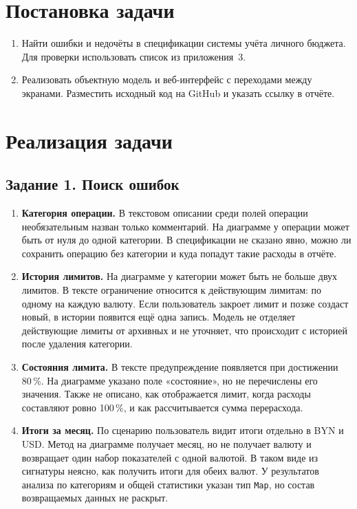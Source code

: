 \documentclass[14pt,a4paper]{extarticle}
\begin{document}
\setcounter{page}{1}

\section*{Постановка задачи}

\begin{enumerate}
    \item Найти ошибки и недочёты в спецификации системы учёта личного бюджета. Для проверки использовать список из приложения~3.
    \item Реализовать объектную модель и веб-интерфейс с переходами между экранами. Разместить исходный код на GitHub и указать ссылку в отчёте.
\end{enumerate}

\section*{Реализация задачи}

\subsection*{Задание 1. Поиск ошибок}

\begin{enumerate}
    \item \textbf{Категория операции.} В текстовом описании среди полей операции необязательным назван только комментарий. На диаграмме у операции может быть от нуля до одной категории. В спецификации не сказано явно, можно ли сохранить операцию без категории и куда попадут такие расходы в отчёте.

    \item \textbf{История лимитов.} На диаграмме у категории может быть не больше двух лимитов. В тексте ограничение относится к действующим лимитам: по одному на каждую валюту. Если пользователь закроет лимит и позже создаст новый, в истории появится ещё одна запись. Модель не отделяет действующие лимиты от архивных и не уточняет, что происходит с историей после удаления категории.

    \item \textbf{Состояния лимита.} В тексте предупреждение появляется при достижении 80\,\%. На диаграмме указано поле «состояние», но не перечислены его значения. Также не описано, как отображается лимит, когда расходы составляют ровно 100\,\%, и как рассчитывается сумма перерасхода.

    \item \textbf{Итоги за месяц.} По сценарию пользователь видит итоги отдельно в BYN и USD. Метод на диаграмме получает месяц, но не получает валюту и возвращает один набор показателей с одной валютой. В таком виде из сигнатуры неясно, как получить итоги для обеих валют. У результатов анализа по категориям и общей статистики указан тип \texttt{Map}, но состав возвращаемых данных не раскрыт.
\end{enumerate}
\end{document}
